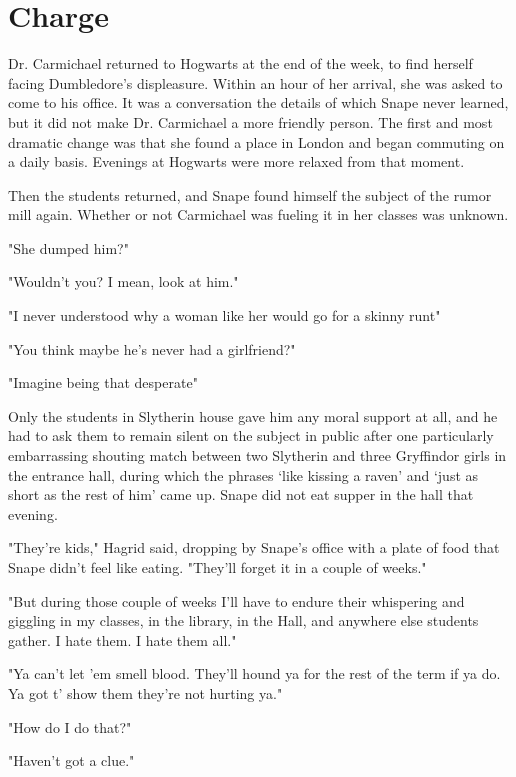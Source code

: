 
\chapter{Charge}

Dr. Carmichael returned to Hogwarts at the end of the week, to find herself facing Dumbledore's displeasure. Within an hour of her arrival, she was asked to come to his office. It was a conversation the details of which Snape never learned, but it did not make Dr. Carmichael a more friendly person. The first and most dramatic change was that she found a place in London and began commuting on a daily basis. Evenings at Hogwarts were more relaxed from that moment.

Then the students returned, and Snape found himself the subject of the rumor mill again. Whether or not Carmichael was fueling it in her classes was unknown.

"She dumped him?"

"Wouldn't you? I mean, look at him."

"I never understood why a woman like her would go for a skinny runt{\el}"

"You think maybe he's never had a girlfriend?"

"Imagine being that desperate{\el}"

Only the students in Slytherin house gave him any moral support at all, and he had to ask them to remain silent on the subject in public after one particularly embarrassing shouting match between two Slytherin and three Gryffindor girls in the entrance hall, during which the phrases `like kissing a raven' and `just as short as the rest of him' came up. Snape did not eat supper in the hall that evening.

"They're kids," Hagrid said, dropping by Snape's office with a plate of food that Snape didn't feel like eating. "They'll forget it in a couple of weeks."

"But during those couple of weeks I'll have to endure their whispering and giggling in my classes, in the library, in the Hall, and anywhere else students gather. I hate them. I hate them all."

"Ya can't let 'em smell blood. They'll hound ya for the rest of the term if ya do. Ya got t' show them they're not hurting ya."

"How do I do that?"

"Haven't got a clue."

